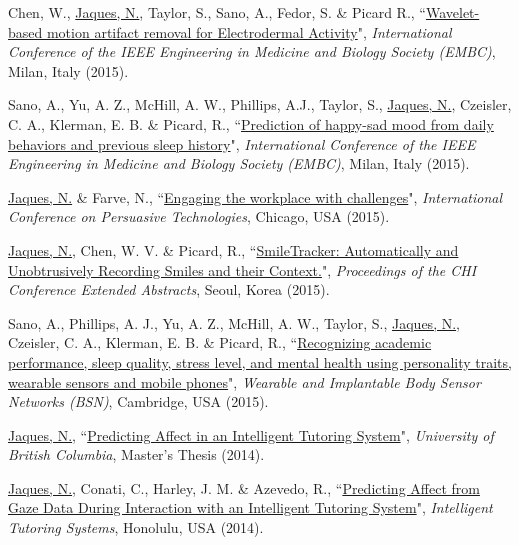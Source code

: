 \documentclass[paper=letter,fontsize=11pt]{scrartcl} %
\newcommand{\PaperEntry}[6]{
        \noindent #1, ``\href{#6}{#2}", \textit{#3}, #4 (#5).}
\begin{document}
\begin{etaremune}
\item \PaperEntry{Chen, W., \underline{Jaques, N.}, Taylor, S., Sano, A., Fedor, S. \& Picard R.}{Wavelet-based motion artifact removal for Electrodermal Activity}{International Conference of the IEEE Engineering in Medicine and Biology Society (EMBC)}{Milan, Italy}{2015}{https://www.ncbi.nlm.nih.gov/pmc/articles/PMC5413204/}

\item \PaperEntry{Sano, A., Yu, A. Z., McHill, A. W., Phillips, A.J., Taylor, S., \underline{Jaques, N.}, Czeisler, C. A., Klerman, E. B. \& Picard, R.}{Prediction of happy-sad mood from daily behaviors and previous sleep history}{International Conference of the IEEE Engineering in Medicine and Biology Society (EMBC)}{Milan, Italy}{2015}{https://www.ncbi.nlm.nih.gov/pmc/articles/PMC4768795/}

\item \PaperEntry{\underline{Jaques, N.} \& Farve, N.}{Engaging the workplace with challenges}{International Conference on Persuasive Technologies}{Chicago, USA}{2015}{https://drive.google.com/file/d/15Pimm1FwwxSPPX04KTr84ilVHJvVExPd/view?usp=sharing}

\item \PaperEntry{\underline{Jaques, N.}, Chen, W. V. \& Picard, R.}{SmileTracker: Automatically and Unobtrusively Recording Smiles and their Context.}{Proceedings of the CHI Conference Extended Abstracts}{Seoul, Korea}{2015}{https://affect.media.mit.edu/pdfs/15.jaques-chen-picard-CHI.pdf}

\item \PaperEntry{Sano, A., Phillips, A. J., Yu, A. Z., McHill, A. W., Taylor, S., \underline{Jaques, N.}, Czeisler, C. A., Klerman, E. B. \& Picard, R.}{Recognizing academic performance, sleep quality, stress level, and mental health using personality traits, wearable sensors and mobile phones}{Wearable and Implantable Body Sensor Networks (BSN)}{Cambridge, USA}{2015}{https://www.ncbi.nlm.nih.gov/pmc/articles/PMC5431072/}

\item \PaperEntry{\underline{Jaques, N.}}{Predicting Affect in an Intelligent Tutoring System}{University of British Columbia}{Master's Thesis}{2014}{https://open.library.ubc.ca/collections/ubctheses/24/items/1.0135541}

\item \PaperEntry{\underline{Jaques, N.}, Conati, C., Harley, J. M. \& Azevedo, R.}{Predicting Affect from Gaze Data During Interaction with an Intelligent Tutoring System}{Intelligent Tutoring Systems}{Honolulu, USA}{2014}{http://www.cs.ubc.ca/~conati/my-papers/ITS-Natasha-2014.pdf}


\end{etaremune}
\end{document}

